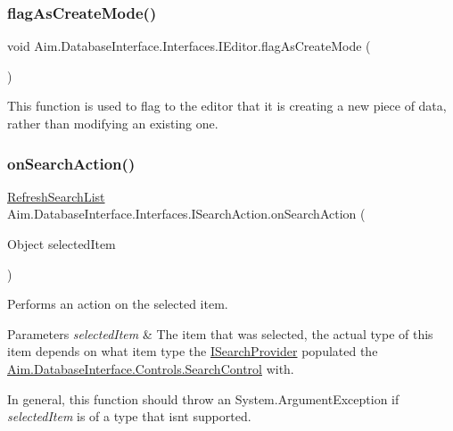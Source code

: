 \subsubsection{\texorpdfstring{flag\+As\+Create\+Mode()}{flagAsCreateMode()}}
{\footnotesize\ttfamily void Aim.\+Database\+Interface.\+Interfaces.\+I\+Editor.\+flag\+As\+Create\+Mode (\begin{DoxyParamCaption}{ }\end{DoxyParamCaption})}



This function is used to flag to the editor that it is creating a new piece of data, rather than modifying an existing one. 

\mbox{\label{interface_aim_1_1_database_interface_1_1_interfaces_1_1_i_search_action_ab23ff488687e962a6806ee8d0f91560c}} 
\subsubsection{\texorpdfstring{on\+Search\+Action()}{onSearchAction()}}
{\footnotesize\ttfamily \mbox{\hyperlink{namespace_aim_1_1_database_interface_1_1_interfaces_aafb04e83cb5c64ff04eaca9a548186eb}{Refresh\+Search\+List}} Aim.\+Database\+Interface.\+Interfaces.\+I\+Search\+Action.\+on\+Search\+Action (\begin{DoxyParamCaption}\item[{Object}]{selected\+Item }\end{DoxyParamCaption})\hspace{0.3cm}{\ttfamily [inherited]}}



Performs an action on the selected item. 


\begin{DoxyParams}{Parameters}
{\em selected\+Item} & The item that was selected, the actual type of this item depends on what item type the \mbox{\hyperlink{interface_aim_1_1_database_interface_1_1_interfaces_1_1_i_search_provider}{I\+Search\+Provider}} populated the \mbox{\hyperlink{class_aim_1_1_database_interface_1_1_controls_1_1_search_control}{Aim.\+Database\+Interface.\+Controls.\+Search\+Control}} with.\\
\hline
\end{DoxyParams}
In general, this function should throw an System.\+Argument\+Exception if {\itshape selected\+Item}  is of a type that isn\textquotesingle{}t supported.

